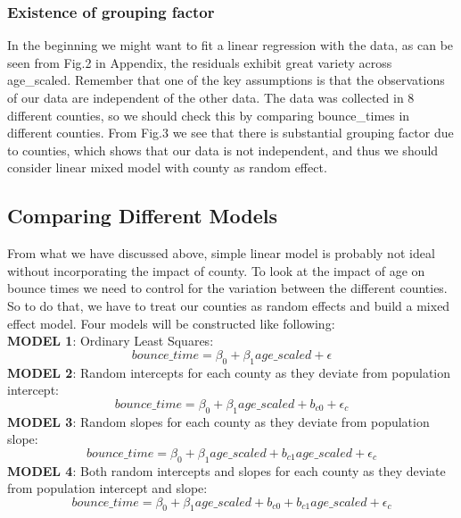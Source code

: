 \documentclass[12pt]{article}
\begin{document}
\subsubsection{Existence of grouping factor}
In the beginning we might want to fit a linear regression with the data, as can be seen from Fig.2 in Appendix, the residuals exhibit great variety across age\_scaled. Remember that one of the key assumptions is that the observations of our data are independent of the other data. The data was collected in 8 different counties, so we should check this by comparing bounce\_times in different counties. From Fig.3 we see that there is substantial grouping factor due to counties, which shows that our data is not independent, and thus we should consider linear mixed model with county as random effect.
\subsection{Comparing Different Models}
From what we have discussed above, simple linear model is probably not ideal without incorporating the impact of county. To look at the impact of age on bounce times we need to control for the variation between the different counties. So to do that, we have to treat our counties as random effects and build a mixed effect model. Four models will be constructed like following:
\\\textbf{MODEL 1}: Ordinary Least Squares:
\begin{equation}
    bounce\_time = \beta_0 + \beta_1age\_scaled + \epsilon
\end{equation}
\textbf{MODEL 2}: Random intercepts for each county as they deviate from population intercept:
\begin{equation}
    bounce\_time = \beta_0 + \beta_1age\_scaled + b_{c0} + \epsilon_c
\end{equation}
\textbf{MODEL 3}: Random slopes for each county as they deviate from population slope:
\begin{equation}
    bounce\_time = \beta_0 + \beta_1age\_scaled + b_{c1}age\_scaled + \epsilon_c
\end{equation}
\textbf{MODEL 4}: Both random intercepts and slopes for each county as they deviate from population intercept and slope:
\begin{equation}
    bounce\_time = \beta_0 + \beta_1age\_scaled +  b_{c0} + b_{c1}age\_scaled + \epsilon_c
\end{equation}

    
\end{document}
